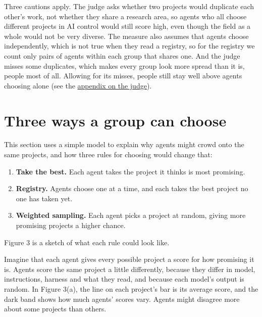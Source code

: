 \documentclass[11pt]{article}
\providecommand{\tightlist}{\setlength{\itemsep}{0pt}\setlength{\parskip}{0pt}}
\begin{document}
Three cautions apply. The judge asks whether two projects would
duplicate each other's work, not whether they share a research area, so
agents who all choose different projects in AI control would still score
high, even though the field as a whole would not be very diverse. The
measure also assumes that agents choose independently, which is not true
when they read a registry, so for the registry we count only pairs of
agents within each group that shares one. And the judge misses some
duplicates, which makes every group look more spread than it is, people
most of all. Allowing for its misses, people still stay well above
agents choosing alone (see the
\hyperref[appendix-the-judge-and-how-far-to-trust-it]{appendix on the
judge}).

\section{Three ways a group can
choose}\label{three-ways-a-group-can-choose}

This section uses a simple model to explain why agents might crowd onto
the same projects, and how three rules for choosing would change that:

\begin{enumerate}
\def\labelenumi{\arabic{enumi}.}
\tightlist
\item
  \textbf{Take the best.} Each agent takes the project it thinks is most
  promising.
\item
  \textbf{Registry.} Agents choose one at a time, and each takes the
  best project no one has taken yet.
\item
  \textbf{Weighted sampling.} Each agent picks a project at random,
  giving more promising projects a higher chance.
\end{enumerate}

Figure 3 is a sketch of what each rule could look like.

Imagine that each agent gives every possible project a score for how
promising it is. Agents score the same project a little differently,
because they differ in model, instructions, harness and what they read,
and because each model's output is random. In Figure 3(a), the line on
each project's bar is its average score, and the dark band shows how
much agents' scores vary. Agents might disagree more about some projects
than others.
\end{document}
